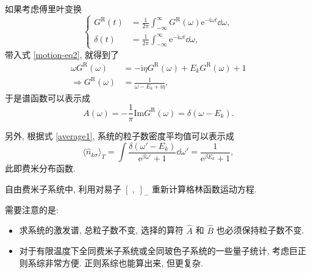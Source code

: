 如果考虑傅里叶变换
\begin{equation}
    \left\{\begin{aligned}
        G^{\mathrm{R}}(t)&=\frac{1}{2\pi}\int_{-\infty}^{\infty}G^{\mathrm{R}}(\omega)\mathrm{e}^{-\mathrm{i}\omega t}\dd \omega,\\
        \delta(t)&=\frac{1}{2\pi}\int_{-\infty}^{\infty}\mathrm{e}^{-\mathrm{i}\omega t}\dd \omega,
    \end{aligned}\right.
\end{equation}
带入式 \eqref{motion-eq2}, 就得到了
 \begin{align}
        \omega G^{\mathrm{R}}(\omega)&=-\mathrm{i}\eta G^{\mathrm{R}}(\omega)+E_k G^{\mathrm{R}}(\omega)+1\nonumber\\
        \Rightarrow G^{\mathrm{R}}(\omega)&=\frac{1}{\omega-E_k+\mathrm{i}\eta},
    \end{align}
于是谱函数可以表示成
\begin{equation}
    A(\omega)=-\frac{1}{\pi}\mathrm{Im}G^{\mathrm{R}}(\omega)=\delta(\omega-E_k).
\end{equation}

另外, 根据式 \eqref{average1}, 系统的粒子数密度平均值可以表示成
\begin{equation}
    \langle \hat{n}_{k\sigma} \rangle_T=\int\frac{\delta(\omega'-E_k)}{\mathrm{e}^{\beta\omega'}+1}\dd\omega'=\frac{1}{\mathrm{e}^{\beta E_k}+1},
\end{equation}
此即费米分布函数. 
\begin{question}{}{}
自由费米子系统中, 利用对易子 $[\; ,\;]_{-}$ 重新计算格林函数运动方程.
\end{question}

需要注意的是:
\begin{itemize}
\item 求系统的激发谱, 总粒子数不变, 选择的算符 $\hat A$ 和 $\hat B$ 也必须保持粒子数不变.
\item 对于有限温度下全同费米子系统或全同玻色子系统的一些量子统计, 考虑巨正则系综非常方便. 正则系综也能算出来, 但更复杂.
\end{itemize}

